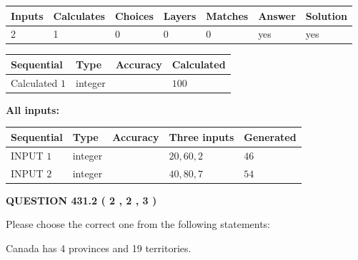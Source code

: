 \documentclass[12pt]{article}
\begin{document}
 

 
   
   
   
   
\noindent\begin{tabular}{|l|l|l|l|l|l|l|}
 \hline
Inputs & Calculates & Choices & Layers & Matches & Answer & Solution \\ \hline
 2  & 
 1  & 
 0
  & 
 0  & 
 0  & 
  yes & 
  yes 
  \\ \hline
 \end{tabular}
   
   
   
   
\noindent{}
   
   
  
  
\noindent\begin{tabular}{|l|l|l|l|}
\hline
 Sequential & Type & Accuracy & Calculated \\ 
\hline
 
 
  Calculated $  1 $ & integer &  & 
  $ 100 $ 
 \\  \hline  
 \end{tabular}
   
   
   
   
\noindent\vspace{0.1in}\hspace{-0.08in} {\textbf{\Large{All inputs: }}}
   
   
  
  
\noindent\begin{tabular}{|l|l|l|l|l|}
\hline
 Sequential & Type & Accuracy & Three inputs & Generated \\ 
\hline
 
 
  INPUT $  1 $ & integer &  & $
 20
 , 
 60
 , 
 2
 $ & $ 46 $ 
 \\  \hline  
 
 
  INPUT $  2 $ & integer &  & $
 40
 , 
 80
 , 
 7
 $ & $ 54 $ 
 \\  \hline  
 \end{tabular}
   
   
  
\vspace{0.2in}
  
{\textbf{\Large{QUESTION
431.2 
 ( 2 , 2 , 3 )
}}}
  
  
Please choose the correct one from the following statements:
 
 
Canada has   4 provinces and  19 territories.
 
\end{document}
